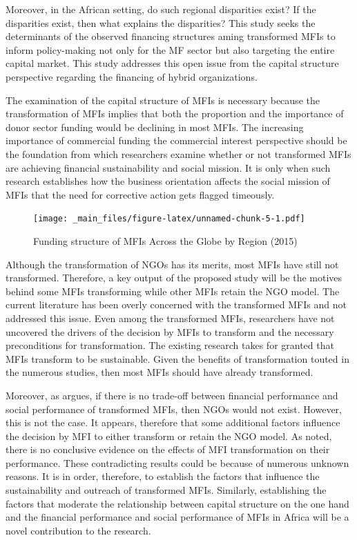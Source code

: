 \documentclass[a4paper,nobind]{templates/ociamthesis}
\begin{document}
Moreover, in the African setting, do such regional disparities exist? If the disparities exist, then what explains the disparities? This study seeks the determinants of the observed financing structures aming transformed MFIs to inform policy-making not only for the MF sector but also targeting the entire capital market. This study addresses this open issue from the capital structure perspective regarding the financing of hybrid organizations.

The examination of the capital structure of MFIs is necessary because the transformation of MFIs implies that both the proportion and the importance of donor sector funding would be declining in most MFIs. The increasing importance of commercial funding the commercial interest perspective should be the foundation from which researchers examine whether or not transformed MFIs are achieving financial sustainability and social mission. It is only when such research establishes how the business orientation affects the social mission of MFIs that the need for corrective action gets flagged timeously.

\begin{figure}
\centering
\texttt{[image: \_main\_files/figure-latex/unnamed-chunk-5-1.pdf]}
\caption{\label{fig:unnamed-chunk-5}Funding structure of MFIs Across the Globe by Region (2015)}
\end{figure}

Although the transformation of NGOs has its merits, most MFIs have still not transformed\autocite{d2017ngos}. Therefore, a key output of the proposed study will be the motives behind some MFIs transforming while other MFIs retain the NGO model. The current literature has been overly concerned with the transformed MFIs and not addressed this issue. Even among the transformed MFIs, researchers have not uncovered the drivers of the decision by MFIs to transform and the necessary preconditions for transformation. The existing research takes for granted that MFIs transform to be sustainable. Given the benefits of transformation touted in the numerous studies, then most MFIs should have already transformed.

Moreover, as \textcite{morduch2019challenges} argues, if there is no trade-off between financial performance and social performance of transformed MFIs, then NGOs would not exist. However, this is not the case. It appears, therefore that some additional factors influence the decision by MFI to either transform or retain the NGO model. As noted, there is no conclusive evidence on the effects of MFI transformation on their performance. These contradicting results could be because of numerous unknown reasons. It is in order, therefore, to establish the factors that influence the sustainability and outreach of transformed MFIs. Similarly, establishing the factors that moderate the relationship between capital structure on the one hand and the financial performance and social performance of MFIs in Africa will be a novel contribution to the research.
\end{document}
